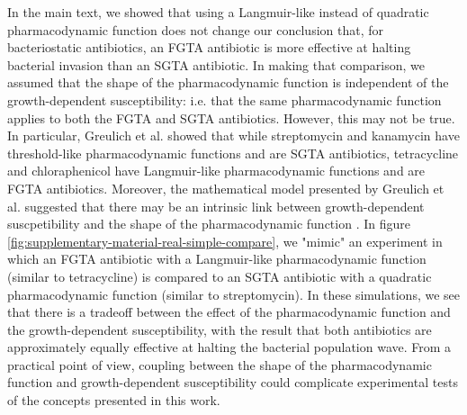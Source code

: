 \documentclass[a4paper]{article}
\begin{document}
In the main text, we showed that using a Langmuir-like instead of quadratic pharmacodynamic function does not change our conclusion that, for bacteriostatic antibiotics, an FGTA antibiotic is more effective at halting bacterial invasion than an SGTA antibiotic. In making that comparison, we assumed that the shape of the pharmacodynamic function is independent of the growth-dependent susceptibility: i.e. that the same pharmacodynamic function applies to both the FGTA and SGTA antibiotics. However, this may not be true.  In particular, Greulich et al. \cite{Greulich2015} showed that while streptomycin and kanamycin have threshold-like pharmacodynamic functions and are SGTA antibiotics, tetracycline and chloraphenicol have Langmuir-like pharmacodynamic functions and are FGTA antibiotics. Moreover, the mathematical model presented by Greulich et al. suggested that there may be an intrinsic link between growth-dependent suscpetibility and the shape of the pharmacodynamic function \cite{Greulich2015}. In figure \ref{fig:supplementary-material-real-simple-compare}, we "mimic" an experiment in which  an FGTA antibiotic with a Langmuir-like pharmacodynamic function (similar to tetracycline) is compared to an SGTA antibiotic with a quadratic pharmacodynamic function (similar to streptomycin). In these simulations, we see that there is a tradeoff between the effect of the pharmacodynamic function and the growth-dependent susceptibility, with the result that both antibiotics are approximately equally effective at halting the bacterial population wave. From a practical point of view, coupling between the shape of the pharmacodynamic function and growth-dependent susceptibility could complicate experimental tests of the concepts presented in this work.  



\end{document}
